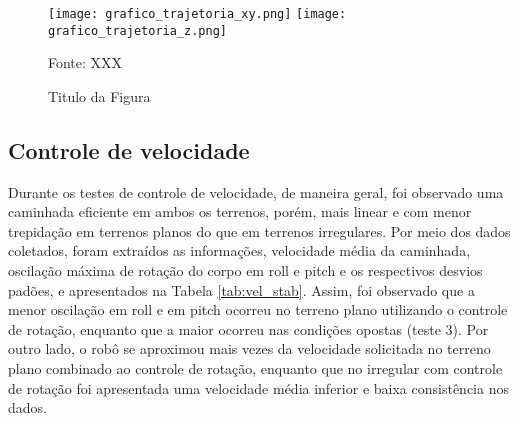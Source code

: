 \documentclass[../main.tex]{subfiles}
\begin{document}
  \begin{figure}[h]
    \centering
    \caption{Titulo da Figura}
    \texttt{[image: grafico\_trajetoria\_xy.png]}
    \texttt{[image: grafico\_trajetoria\_z.png]}
    
    Fonte: XXX
    \label{fig:grafico_trajetoria_xyz}
  \end{figure}

  \subsection{Controle de velocidade}
  Durante os testes de controle de velocidade, de maneira geral, foi observado uma caminhada eficiente em ambos os terrenos, porém, mais linear e com menor trepidação em terrenos planos do que em terrenos irregulares. Por meio dos dados coletados, foram extraídos as informações, velocidade média da caminhada, oscilação máxima de rotação do corpo em roll e pitch e os respectivos desvios padões, e apresentados na Tabela \ref{tab:vel_stab}. Assim, foi observado que a menor oscilação em roll e em pitch ocorreu no terreno plano utilizando o controle de rotação, enquanto que a maior ocorreu nas condições opostas (teste 3).  Por outro lado, o robô se aproximou mais vezes da velocidade solicitada no terreno plano combinado ao controle de rotação, enquanto que no irregular com controle de rotação foi apresentada uma velocidade média inferior e baixa consistência nos dados.
\end{document}
